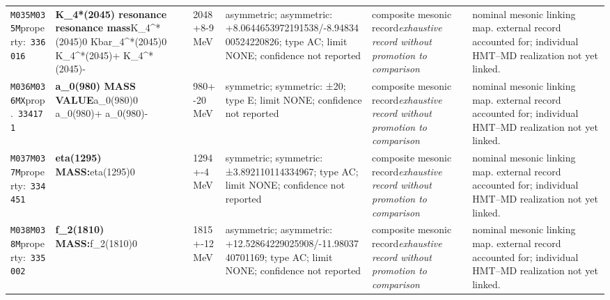 \begin{landscape}
\begin{longtable}{L{1.85cm}L{4.45cm}L{2.35cm}L{4.05cm}L{3.35cm}L{7.15cm}}
\texttt{M035}\newline \texttt{M035M}\newline property:\ \texttt{336016} & \textbf{K\_\allowbreak{}4*(2045) resonance resonance mass}\newline K\_\allowbreak{}4\textasciicircum{}*(2045)0 \textbar{}\allowbreak{} Kbar\_\allowbreak{}4\textasciicircum{}*(2045)0 \textbar{}\allowbreak{} K\_\allowbreak{}4\textasciicircum{}*(2045)+ \textbar{}\allowbreak{} K\_\allowbreak{}4\textasciicircum{}*(2045)- & 2048+8-9\,MeV & asymmetric; asymmetric: +8.0644653972191538/-8.9483400524220826; type AC; limit NONE; confidence not reported & composite mesonic record\newline \emph{exhaustive record without promotion to comparison} & nominal mesonic linking map. external record accounted for; individual HMT--MD realization not yet linked. \\
\texttt{M036}\newline \texttt{M036MX}\newline prop.\ \texttt{334171} & \textbf{a\_\allowbreak{}0(980) MASS VALUE}\newline a\_\allowbreak{}0(980)0 \textbar{}\allowbreak{} a\_\allowbreak{}0(980)+ \textbar{}\allowbreak{} a\_\allowbreak{}0(980)- & 980+-20\,MeV & symmetric; symmetric: ±20; type E; limit NONE; confidence not reported & composite mesonic record\newline \emph{exhaustive record without promotion to comparison} & nominal mesonic linking map. external record accounted for; individual HMT--MD realization not yet linked. \\
\texttt{M037}\newline \texttt{M037M}\newline property:\ \texttt{334451} & \textbf{eta(1295) MASS:}\newline eta(1295)0 & 1294+-4\,MeV & symmetric; symmetric: ±3.892110114334967; type AC; limit NONE; confidence not reported & composite mesonic record\newline \emph{exhaustive record without promotion to comparison} & nominal mesonic linking map. external record accounted for; individual HMT--MD realization not yet linked. \\
\texttt{M038}\newline \texttt{M038M}\newline property:\ \texttt{335002} & \textbf{f\_\allowbreak{}2(1810) MASS:}\newline f\_\allowbreak{}2(1810)0 & 1815+-12\,MeV & asymmetric; asymmetric: +12.52864229025908/-11.9803740701169; type AC; limit NONE; confidence not reported & composite mesonic record\newline \emph{exhaustive record without promotion to comparison} & nominal mesonic linking map. external record accounted for; individual HMT--MD realization not yet linked. \\

\end{longtable}
\end{landscape}
